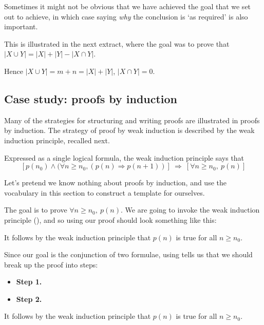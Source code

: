 Sometimes it might not be obvious that we have achieved the goal that we set out to achieve, in which case saying \textit{why} the conclusion is `as required' is also important.

This is illustrated in the next extract, where the goal was to prove that $|X \cup Y| = |X| + |Y| - |X \cap Y|$.

\begin{extract}
\label{xtrConclusionExampleTwo}
Hence $|X \cup Y| = m+n = |X| + |Y|$,  $|X \cap Y| = 0$.
\end{extract}

\subsection*{Case study: proofs by induction}

Many of the strategies for structuring and writing proofs are illustrated in proofs by induction. The strategy of proof by weak induction is described by the weak induction principle, recalled next.


Expressed as a single logical formula, the weak induction principle says that
\[ [p(n_0) \wedge (\forall n \ge n_0, (p(n) \Rightarrow p(n+1))]~\Rightarrow~[\forall n \ge n_0,~p(n)] \]

Let's pretend we know nothing about proofs by induction, and use the vocabulary in this section to construct a template for ourselves.

The goal is to prove $\forall n \ge n_0,~ p(n)$. We are going to invoke the weak induction principle (), and so using  our proof should look something like this:

\begin{snippet}

It follows by the weak induction principle that $p(n)$ is true for all $n \ge n_0$.
\end{snippet}

Since our goal is the conjunction of two formulae, using  tells us that we should break up the proof into steps:

\begin{snippet}
\begin{itemize}
\item \textbf{Step 1.} 
\item \textbf{Step 2.} 
\end{itemize}

It follows by the weak induction principle that $p(n)$ is true for all $n \ge n_0$.
\end{snippet}

